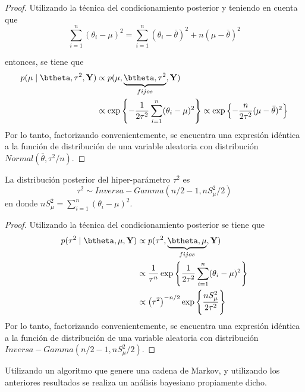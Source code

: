 \begin{proof}
Utilizando la técnica del condicionamiento posterior y teniendo en cuenta que
\begin{equation*}
\sum_{i=1}^n(\theta_i-\mu)^2=\sum_{i=1}^n(\theta_i-\bar{\theta})^2+n(\mu-\bar{\theta})^2
\end{equation*}

entonces, se tiene que
\begin{align*}
p(\mu \mid \btheta,\tau^2,\mathbf{Y})
&\propto p(\mu,\underbrace{\btheta,\tau^2}_{fijos},\mathbf{Y})\\
&\propto \exp\left\{-\frac{1}{2\tau^2}\sum_{i=1}^n(\theta_i-\mu)^2\right\}
 \propto \exp\left\{-\frac{n}{2\tau^2}(\mu-\bar{\theta})^2\right\}
\end{align*}
Por lo tanto, factorizando convenientemente, se encuentra una expresión idéntica a la función de distribución de una variable aleatoria con distribución $Normal(\bar{\theta},\tau^2/n)$.
\end{proof}

\begin{Res}
La distribución posterior del hiper-parámetro $\tau^2$ es
\begin{equation*}
\tau^2 \sim Inversa-Gamma(n/2-1,nS^2_{\mu}/2)
\end{equation*}
en donde $nS^2_{\mu}=\sum_{i=1}^n(\theta_i-\mu)^2$.
\end{Res}

\begin{proof}
Utilizando la técnica del condicionamiento posterior se tiene que
\begin{align*}
p(\tau^2 \mid \btheta,\mu,\mathbf{Y})
&\propto p(\tau^2,\underbrace{\btheta,\mu}_{fijos},\mathbf{Y})\\
&\propto \frac{1}{\tau^n} \exp\left\{\frac{1}{2\tau^2}\sum_{i=1}^n(\theta_i-\mu)^2\right\}\\
&\propto \left(\tau^2\right)^{-n/2} \exp\left\{\frac{nS^2_{\mu}}{2\tau^2}\right\}
\end{align*}
Por lo tanto, factorizando convenientemente, se encuentra una expresión idéntica a la función de distribución de una variable aleatoria con distribución $Inversa-Gamma(n/2-1,nS^2_{\mu}/2)$.
\end{proof}

Utilizando un algoritmo que genere una cadena de Markov, y utilizando los anteriores resultados se realiza un análisis bayesiano propiamente dicho.

